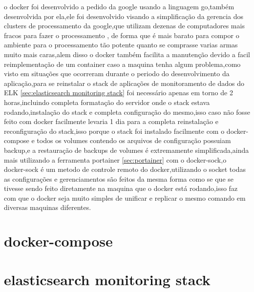 \documentclass[
	12pt,				%
	openright,			%
	oneside,			%
	a4paper,			%
	english,			%
	french,				%
	spanish,			%
	brazil,				%
	]{abntex2}
\begin{document}
o docker foi desenvolvido a pedido da google usando a linguagem go,também desenvolvida por ela,ele foi desenvolvido visando a simplificação da gerencia dos clusters de processamento da google,que utilizam dezenas de computadores mais fracos para fazer o processamento , de forma que é mais barato para compor o ambiente para o processamento tão potente quanto se comprasse varias armas muito mais caras,alem disso o docker também facilita a manutenção devido a facil reimplementação de um container caso a maquina tenha algum problema,como visto em situações que ocorreram durante o periodo do desenvolvimento da aplicação,para se reinstalar o stack de aplicações de monitoramento de dados do ELK \autoref{sec:elasticsearch monitoring stack} foi necessário apenas em torno de 2 horas,incluindo completa formatação do servidor onde o stack estava rodando,instalação do stack e completa configuração do mesmo,isso caso não fosse feito com docker facilmente levaria 1 dia para a completa reinstalação e reconfiguração do stack,isso porque o stack foi instalado facilmente com o docker-compose e todos os volumes contendo os arquivos de configuração possuiam backup,e a restauração de backups de volumes é extremamente simplificada,ainda mais utilizando a ferramenta portainer \autoref{sec:portainer} com o docker-sock,o docker-sock é um metodo de controle remoto do docker,utilizando o socket todas as configurações e gerenciamentos são feitos da mesma forma como se que se tivesse sendo feito diretamente na maquina que o docker está rodando,isso faz com que o docker seja muito simples de unificar e replicar o mesmo comando em diversas maquinas diferentes.


\section{docker-compose}
\label{sec:docker-compose}

\section{elasticsearch monitoring stack}
\label{sec:elasticsearch monitoring stack}
\end{document}
